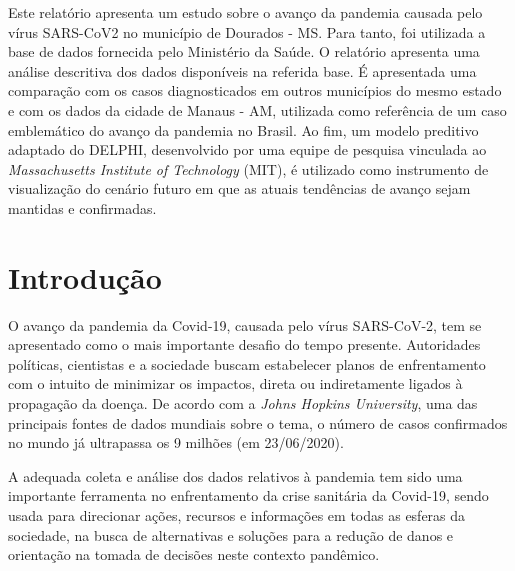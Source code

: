\documentclass[12pt]{article}
\begin{document}
\begin{resumo} 
  Este relatório apresenta um estudo sobre o avanço da pandemia causada pelo vírus SARS-CoV2 no município de Dourados - MS. Para tanto, foi utilizada a base de dados fornecida pelo Ministério da Saúde. O relatório apresenta uma análise descritiva dos dados disponíveis na referida base. É apresentada uma comparação com os casos diagnosticados em outros municípios do mesmo estado e com os dados da cidade de Manaus - AM, utilizada como referência de um caso emblemático do avanço da pandemia no Brasil. Ao fim, um modelo preditivo adaptado do DELPHI, desenvolvido por uma equipe de pesquisa vinculada ao \textit{Massachusetts Institute of Technology} (MIT), é utilizado como instrumento de visualização do cenário futuro em que as atuais tendências de avanço sejam mantidas e confirmadas.
\end{resumo}


\section{Introdução}

O avanço da pandemia da Covid-19, causada pelo vírus SARS-CoV-2, tem se apresentado como o mais importante desafio do tempo presente. Autoridades políticas, cientistas e a sociedade buscam estabelecer planos de enfrentamento com o intuito de minimizar os impactos, direta ou indiretamente ligados à propagação da doença. De acordo com a \textit{Johns Hopkins University}, uma das principais fontes de dados mundiais sobre o tema, o número de casos confirmados no mundo já ultrapassa os 9 milhões (em 23/06/2020).

A adequada coleta e análise dos dados relativos à pandemia tem sido uma importante ferramenta no enfrentamento da crise sanitária da Covid-19, sendo usada para direcionar ações, recursos e informações em todas as esferas da sociedade, na busca de alternativas e soluções para a redução de danos e orientação na tomada de decisões neste contexto pandêmico.
\end{document}
